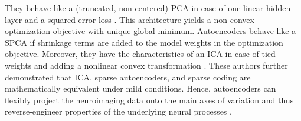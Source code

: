 \documentclass{article} %
\newcommand{\suggestadd}[1]{{\color{blue} #1}}
\begin{document}
They behave like a \suggestadd{(truncated, non-centered)} PCA
in case of one linear hidden layer and a squared error loss
\cite{baldi1989neural}.
This architecture yields a \suggestadd{non-}convex optimization objective
with unique global minimum.
Autoencoders behave like a SPCA if shrinkage terms are added to the
model weights in the optimization objective.
Moreover, they have the characteristics of an ICA in case of tied weights
and adding a nonlinear convex transformation \cite{le2011ica}.
These authors further demonstrated that ICA, sparse autoencoders, and 
sparse coding are mathematically equivalent
under mild conditions.
%
Hence, autoencoders can flexibly project the neuroimaging data
onto the main axes of variation and thus %
reverse-engineer properties of the underlying
neural processes \cite{olshausen96}.
\end{document}
